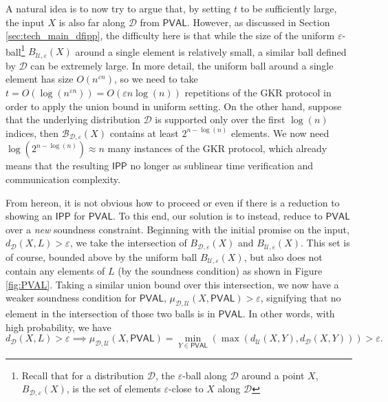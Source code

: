 \documentclass[10pt,a4paper]{article}
\newcommand{\PVAL}{\mathsf{PVAL}}
\newcommand{\IPP}{\mathsf{IPP}}
\newcommand{\sU}{\mathcal{U}}
\newcommand{\sD}{\mathcal{D}}
\newcommand{\sB}{\mathcal{B}}
\begin{document}
A natural idea is to now try to argue that, by setting $t$ to be sufficiently large, the input $X$ is also far along $\mathcal{D}$ from $\PVAL$.  However, as discussed in Section \ref{sec:tech_main_dfipp}, the difficulty here is that while the size of the uniform $\varepsilon$-ball\footnote{Recall that for a distribution $\mathcal{D}$, the $\varepsilon$-ball along $\mathcal{D}$ around a point $X$, $B_{\mathcal{D}, \varepsilon}(X)$, is the set of elements $\varepsilon$-close to $X$ along $\mathcal{D}$} $B_{\sU,\varepsilon}(X)$ around a single element is relatively small, a similar ball defined by $\mathcal{D}$ can be extremely large. In more detail, the uniform ball around a single element has size $O(n^{\varepsilon n})$, so we need to take $t = O(\log (n^{\varepsilon n}))=O(\varepsilon n\log (n))$ repetitions of the GKR protocol in order to apply the union bound in uniform setting. On the other hand, suppose that the underlying distribution $\sD$ is supported only over the first $\log(n)$ indices, then $\sB_{\sD,\varepsilon}(X)$ contains at least $2^{n-\log(n)}$ elements. We now need $\log (2^{n-\log (n)})\approx n$ many instances of the GKR protocol, which already means that the resulting $\IPP$ no longer as sublinear time verification and communication complexity. 


From hereon, it is not obvious how to proceed or even if there is a reduction to showing an $\IPP$ for $\PVAL$. To this end, our solution is to  instead, reduce to $\PVAL$ over a \textit{new} soundness constraint. Beginning with the initial promise on the input, $d_{\mathcal{D}}(X, L)>\varepsilon$, we take the intersection of $B_{\sD,\varepsilon}(X)$ and $B_{\sU,\varepsilon}(X)$. This set is of course, bounded above by the uniform ball $B_{\sU,\varepsilon}(X)$, but also does not contain any elements of $L$ (by the soundness condition) as shown in Figure \ref{fig:PVAL}. Taking a similar union bound over this intersection, we now have a weaker soundness condition for $\PVAL$, $\mu_{\mathcal{D}, \mathcal{U}}(X, \PVAL)>\varepsilon$, signifying that no element in the intersection of those two balls is in $\PVAL$. In other words, with high probability, we have 
\begin{equation*}
    d_{\mathcal{D}}(X,L)>\varepsilon\implies \mu_{\mathcal{D}, \mathcal{U}}(X,\PVAL) = \min_{Y\in \PVAL} \left(\max (d_{\mathcal{U}}(X,Y), d_{\mathcal{D}}(X,Y)) \right) > \varepsilon.
\end{equation*} 
\end{document}
